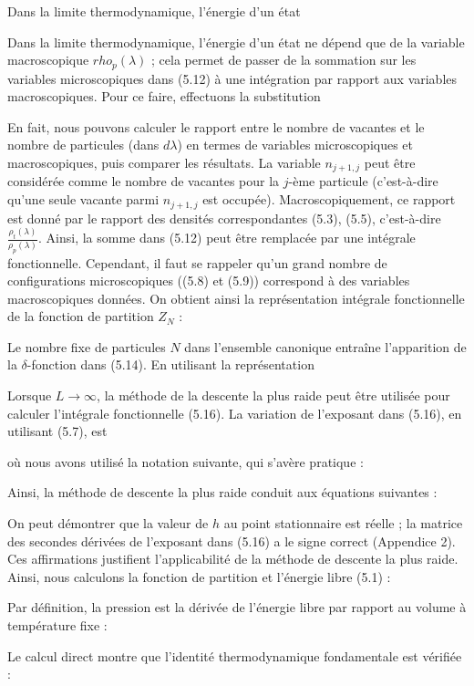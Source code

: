 Dans la limite thermodynamique, l'énergie d'un état

Dans la limite thermodynamique, l'énergie d'un état ne dépend que de la variable macroscopique \( rho_p(\lambda) \) ; cela permet de passer  
de la sommation sur les variables microscopiques dans (5.12) à une intégration par rapport aux variables macroscopiques.  
Pour ce faire, effectuons la substitution

En fait, nous pouvons calculer le rapport entre le nombre de vacantes et le nombre de particules (dans \( d\lambda \)) en termes de variables microscopiques et macroscopiques, puis comparer les résultats.  
La variable \( n_{j+1 , j} \) peut être considérée comme le nombre de vacantes pour la \( j \)-ème particule (c'est-à-dire qu'une seule vacante parmi \( n_{j+1,j} \) est occupée).  
Macroscopiquement, ce rapport est donné par le rapport des densités correspondantes (5.3), (5.5), c'est-à-dire \( \frac{\rho_t(\lambda)}{\rho_p(\lambda)} \).  
Ainsi, la somme dans (5.12) peut être remplacée par une intégrale fonctionnelle.  
Cependant, il faut se rappeler qu'un grand nombre de configurations microscopiques ((5.8) et (5.9)) correspond à des variables macroscopiques données.  
On obtient ainsi la représentation intégrale fonctionnelle de la fonction de partition \( Z_N \) :

Le nombre fixe de particules \( N \) dans l'ensemble canonique entraîne l'apparition de la \( \delta \)-fonction dans (5.14).  
En utilisant la représentation

Lorsque \( L \to \infty \), la méthode de la descente la plus raide peut être utilisée pour calculer l'intégrale fonctionnelle (5.16).  
La variation de l'exposant dans (5.16), en utilisant (5.7), est

où nous avons utilisé la notation suivante, qui s'avère pratique :

Ainsi, la méthode de descente la plus raide conduit aux équations suivantes :

On peut démontrer que la valeur de $h$ au point stationnaire est réelle ;  
la matrice des secondes dérivées de l'exposant dans (5.16) a le signe correct (Appendice 2).  
Ces affirmations justifient l'applicabilité de la méthode de descente la plus raide.  
Ainsi, nous calculons la fonction de partition et l'énergie libre (5.1) :

Par définition, la pression est la dérivée de l'énergie libre par rapport  
au volume à température fixe :

Le calcul direct montre que l'identité thermodynamique fondamentale est vérifiée :

